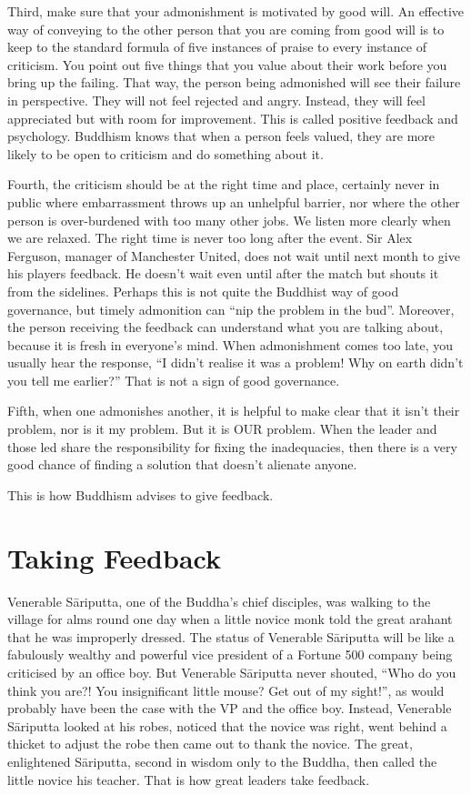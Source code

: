 ﻿\documentclass[11pt, openany]{book}
\begin{document}
Third, make sure that your admonishment is motivated by good will. An effective way of conveying to the other person that you are coming from good will is to keep to the standard formula of five instances of praise to every instance of criticism. You point out five things that you value about their work before you bring up the failing. That way, the person being admonished will see their failure in perspective. They will not feel rejected and angry. Instead, they will feel appreciated but with room for improvement. This is called positive feedback and psychology. Buddhism knows that when a person feels valued, they are more likely to be open to criticism and do something about it.

Fourth, the criticism should be at the right time and place, certainly never in public where embarrassment throws up an unhelpful barrier, nor where the other person is over-burdened with too many other jobs. We listen more clearly when we are relaxed. The right time is never too long after the event. Sir Alex Ferguson, manager of Manchester United, does not wait until next month to give his players feedback. He doesn’t wait even until after the match but shouts it from the sidelines. Perhaps this is not quite the Buddhist way of good governance, but timely admonition can “nip the problem in the bud”. Moreover, the person receiving the feedback can understand what you are talking about, because it is fresh in everyone’s mind. When admonishment comes too late, you usually hear the response, “I didn’t realise it was a problem! Why on earth didn’t you tell me earlier?” That is not a sign of good governance.

Fifth, when one admonishes another, it is helpful to make clear that it isn’t their problem, nor is it my problem. But it is OUR problem. When the leader and those led share the responsibility for fixing the inadequacies, then there is a very good chance of finding a solution that doesn’t alienate anyone.

This is how Buddhism advises to give feedback.

\section{Taking Feedback}

Venerable Sāri\-putta, one of the Buddha’s chief disciples, was walking to the village for alms round one day when a little novice monk told the great arahant that he was improperly dressed. The status of Venerable Sāri\-putta will be like a fabulously wealthy and powerful vice president of a Fortune 500 company being criticised by an office boy. But Venerable Sāri\-putta never shouted, “Who do you think you are?! You insignificant little mouse? Get out of my sight!”, as would probably have been the case with the VP and the office boy. Instead, Venerable Sāri\-putta looked at his robes, noticed that the novice was right, went behind a thicket to adjust the robe then came out to thank the novice. The great, enlightened Sāri\-putta, second in wisdom only to the Buddha, then called the little novice his teacher. That is how great leaders take feedback.
\end{document}
